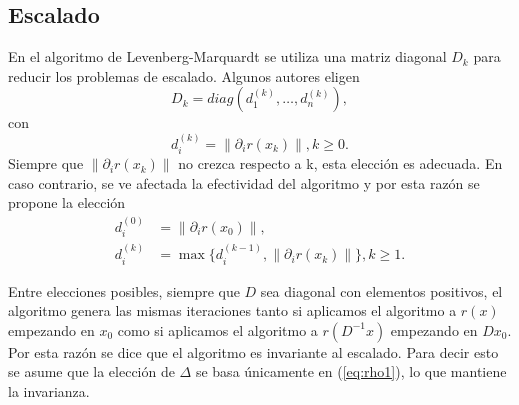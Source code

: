 \documentclass[11pt,a4paper]{book}
\theoremstyle{definition}
\theoremstyle{remark}
\newcommand{\norm}[1]{\left\lVert#1\right\rVert}
\begin{document}
\subsection{Escalado}
En el algoritmo de Levenberg-Marquardt se utiliza una matriz diagonal $D_k$ para
reducir los problemas de escalado.
Algunos autores eligen
\begin{equation}\label{eq:diag}
	D_k = diag(d_1^{(k)}, \ldots, d_n^{(k)}),
\end{equation}
con
\begin{equation}
	d_i^{(k)}=\norm{\partial_ir(x_k)}, k\geq 0.
\end{equation}
Siempre que $\norm{\partial_ir(x_k)}$ no crezca respecto a k, esta elección es adecuada. En caso contrario,
se ve afectada la efectividad del algoritmo y por esta razón se propone la elección
\begin{equation} \label{eq:di}
	\begin{split}
	d_i^{(0)} &= \norm{\partial_ir(x_0)}, \\
	d_i^{(k)} &= \max \{d_i^{(k-1)}, \norm{\partial_ir(x_k)}\}, k\geq 1.
	\end{split}
\end{equation}

Entre elecciones posibles,
siempre que $D$ sea diagonal con elementos positivos, el algoritmo genera las mismas iteraciones tanto si aplicamos
el algoritmo a $r(x)$ empezando en $x_0$ como si aplicamos el algoritmo a $r(D^{-1}x)$ empezando en $Dx_0$.
Por esta razón se dice que el algoritmo es invariante al escalado. Para decir esto se asume que la elección
de $\Delta$ se basa únicamente en (\ref{eq:rho1}), lo que mantiene la invarianza.
\end{document}
